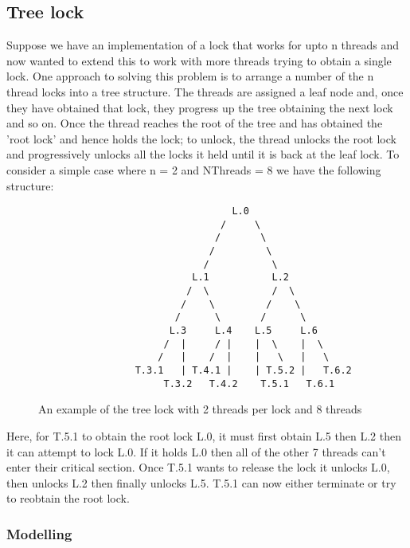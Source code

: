 \subsection{Tree lock}


Suppose we have an implementation of a lock that works for upto n threads and now wanted to extend this to work with more threads trying to obtain a single lock. One approach to solving this problem is to arrange a number of the n thread locks into a tree structure. The threads are assigned a leaf node and, once they have obtained that lock, they progress up the tree obtaining the next lock and so on. Once the thread reaches the root of the tree and has obtained the 'root lock' and hence holds the lock; to unlock, the thread unlocks the root lock and progressively unlocks all the locks it held until it is back at the leaf lock. To consider a simple case where n = 2 and NThreads = 8 we have the following structure: 

\begin{figure}
\begin{verbatim}
                                  L.0
                                /     \                    
                               /       \
                              /         \
                             /           \
                           L.1           L.2
                          /  \           /  \
                         /    \         /    \
                        /      \       /      \
                       L.3     L.4    L.5     L.6
                      /  |     / |    |  \    |  \
                     /   |    /  |    |   \   |   \
                 T.3.1   | T.4.1 |    | T.5.2 |   T.6.2
                      T.3.2   T.4.2    T.5.1   T.6.1
\end{verbatim}
\caption{An example of the tree lock with 2 threads per lock and 8 threads \label{fig:Tree}}
\end{figure}

Here, for T.5.1 to obtain the root lock L.0, it must first obtain L.5 then L.2 then it can attempt to lock L.0. If it holds L.0 then all of the other 7 threads can't enter their critical section. Once T.5.1 wants to release the lock it unlocks L.0, then unlocks L.2 then finally unlocks L.5. T.5.1 can now either terminate or try to reobtain the root lock.

\subsubsection{Modelling}

